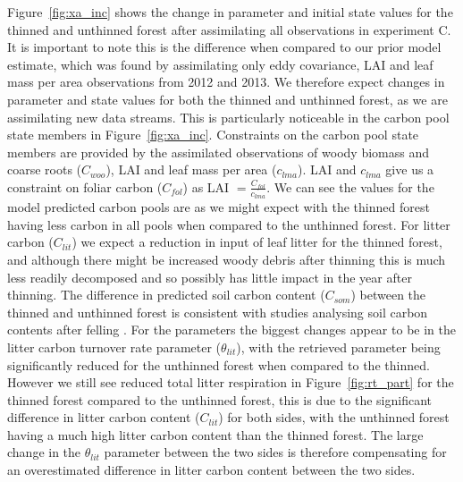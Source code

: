 \documentclass[draft,linenumbers]{agujournal}
\begin{document}
Figure~\ref{fig:xa_inc} shows the change in parameter and initial state values for the thinned and unthinned forest after assimilating all observations in experiment C. It is important to note this is the difference when compared to our prior model estimate, which was found by assimilating only eddy covariance, LAI and leaf mass per area observations from 2012 and 2013. We therefore expect changes in parameter and state values for both the thinned and unthinned forest, as we are assimilating new data streams. This is particularly noticeable in the carbon pool state members in Figure~\ref{fig:xa_inc}. Constraints on the carbon pool state members are provided by the assimilated observations of woody biomass and coarse roots (\(C_{woo}\)), LAI and leaf mass per area (\(c_{lma}\)). LAI and \(c_{lma}\) give us a constraint on foliar carbon (\(C_{fol}\)) as LAI \(= \frac{C_{fol}}{c_{lma}} \). We can see the values for the model predicted carbon pools are as we might expect with the thinned forest having less carbon in all pools when compared to the unthinned forest. For litter carbon (\(C_{lit}\)) we expect a reduction in input of leaf litter for the thinned forest, and although there might be increased woody debris after thinning this is much less readily decomposed and so possibly has little impact in the year after thinning. The difference in predicted soil carbon content (\(C_{som}\)) between the thinned and unthinned forest is consistent with studies analysing soil carbon contents after felling \citep{Hernesmaa2005777}. For the parameters the biggest changes appear to be in the litter carbon turnover rate parameter (\(\theta_{lit}\)), with the retrieved parameter being significantly reduced for the unthinned forest when compared to the thinned. However we still see reduced total litter respiration in Figure~\ref{fig:rt_part} for the thinned forest compared to the unthinned forest, this is due to the significant difference in litter carbon content (\(C_{lit}\)) for both sides, with the unthinned forest having a much high litter carbon content than the thinned forest. The large change in the \(\theta_{lit}\) parameter between the two sides is therefore compensating for an overestimated difference in litter carbon content between the two sides.    
 \clearpage
 
 
\end{document}
